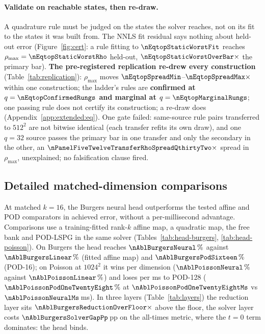 \paragraph{Validate on reachable states, then re-draw.}

A quadrature rule must be judged on the states the solver reaches, not
on its fit to the states it was built from. The NNLS fit residual says nothing about held-out error
(Figure~\ref{fig:cert}: a rule fitting to $\nEqtopStaticWorstFit$ reaches
$\rho_{\max}=\nEqtopStaticWorstRho$ held-out, $\nEqtopStaticWorstOverBar\times$
the primary bar).
\textbf{The pre-registered replication re-drew every construction}
(Table~\ref{tab:replication}): $\rho_{\max}$ moves
$\nEqtopSpreadMin$--$\nEqtopSpreadMax\times$ within one construction; the
ladder's rules are \textbf{confirmed at $q=\nEqtopConfirmedRungs$ and
marginal at $q=\nEqtopMarginalRungs$}; one passing rule does not certify its construction; a re-draw does
(Appendix~\ref{app:extended:eq}). One gate failed: same-source rule pairs transferred to
$512^2$ are not bitwise identical (each transfer refits its own
draw), and one $q=32$ source passes the primary bar in one
transfer and only the secondary in the other, an
$\nPanelFiveTwelveTransferRhoSpreadQthirtyTwo\times$ spread in
$\rho_{\max}$, unexplained; no falsification clause fired.

\subsection{Detailed matched-dimension comparisons}


At matched $k=16$, the Burgers neural head outperforms the tested affine
and POD comparators in achieved error, without a per-millisecond
advantage. Comparisons use a training-fitted rank-$k$ affine map,
a quadratic map, the free bank and
POD-LSPG in the same solver (Tables~\ref{tab:head-burgers},
\ref{tab:head-poisson}). On Burgers the head reaches
$\nAblBurgersNeural\,\%$ against $\nAblBurgersLinear\,\%$ (fitted affine
map) and $\nAblBurgersPodSixteen\,\%$ (POD-16); on Poisson at $1024^2$ it wins per dimension ($\nAblPoissonNeural\,\%$ against
$\nAblPoissonLinear\,\%$) and loses per ms to POD-128
($\nAblPoissonPodOneTwentyEight\,\%$ at
$\nAblPoissonPodOneTwentyEightMs$ vs $\nAblPoissonNeuralMs$\,ms).
In three layers (Table~\ref{tab:layers}) the reduction layer sits
$\nAblBurgersReductionOverFloor\times$ above the floor, the solver
layer costs $\nAblBurgersSolverGapPp$\,pp on the all-times metric, where
the $t=0$ term dominates: the head binds.

